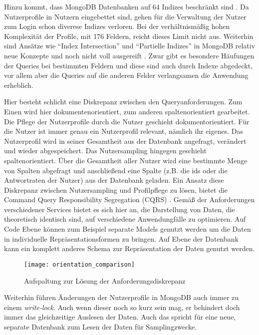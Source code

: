 Hinzu kommt, dass MongoDB Datenbanken auf 64 Indizes beschränkt sind \cite{mongo:indexlimit}. Da Nutzerprofile in Nutzern eingebettet sind, gehen für die Verwaltung der Nutzer zum Login schon diverese Indizes verloren. Bei der verhältnismäßig hohen Komplexität der Profile, mit 176 Feldern, reicht dieses Limit nicht aus.
Weiterhin sind Ansätze wie ``Index Intersection'' und ``Partielle Indizes'' in MongoDB relativ neue Konzepte und noch nicht voll ausgereift\cite{mongo:indexintersection} \cite{mongo:partialindexes}.
Zwar gibt es besondere Häufungen der Queries bei bestimmten Feldern und diese sind auch durch Indexe abgedeckt, vor allem aber die Queries auf die anderen Felder verlangsamen die Anwendung erheblich.

Hier besteht schlicht eine Diskrepanz zwischen den Queryanforderungen. Zum Einen wird hier dokumentenorientiert, zum anderen spaltenorientiert gearbeitet.
Die Pflege der Nutzerprofile durch die Nutzer geschieht dokumentorientiert. Für die Nutzer ist immer genau ein Nutzerprofil relevant, nämlich ihr eigenes. Das Nutzerprofil wird in seiner Gesamtheit aus der Datenbank angefragt, verändert und wieder abgespeichert.
Das Nutzersampling hingegen geschieht spaltenorientiert. Über die Gesamtheit aller Nutzer wird eine bestimmte Menge von Spalten abgefragt und anschließend eine Spalte (z.B. die ids oder die Antwortraten der Nutzer) aus der Datenbank geladen.
Ein Ansatz diese Diskrepanz zwischen Nutzersampling und Profilpflege zu lösen, bietet die Command Query Responsibility Segregation (CQRS) \cite[][]{fowler:cqrs}. Gemäß der Anforderungen verschiedener Services bietet es sich hier an, die Darstellung von Daten, die theoretisch identisch sind, auf verschiedene Anwendungfälle zu optimieren. Auf Code Ebene können zum Beispiel separate Models genutzt werden um die Daten in individuelle Repräsentationsformen zu bringen. Auf Ebene der Datenbank kann ein komplett anderes Schema zur Repräsentation der Daten genutzt werden.

\begin{figure}[!ht]
    \centering
    \caption{Aufspaltung zur Lösung der Anforderungsdiskrepanz}
    \label{fig:orientationsplit}
    \texttt{[image: orientation\_comparison]}
\end{figure}

Weiterhin führen Änderungen der Nutzerprofile in MongoDB auch immer zu einem \textit{write-lock}. Auch wenn dieser noch so kurz sein mag, er behindert doch immer das gleichzeitige Auslesen der Daten. Auch das spricht für eine neue, separate Datenbank zum Lesen der Daten für Samplingzwecke.

